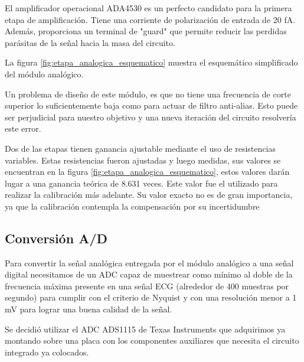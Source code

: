 \documentclass[conference]{IEEEtran}
\begin{document}
El amplificador operacional ADA4530  es un perfecto candidato para
la primera etapa de amplificación. Tiene una corriente de polarización de entrada de
20 fA. Además, proporciona un terminal de "guard" que permite reducir las perdidas
parásitas de la señal hacia la masa del circuito.
 
La figura \ref{fig:etapa_analogica_esquematico} muestra el esquemático simplificado
del módulo analógico.

Un problema de diseño de este módulo, es que no tiene una frecuencia de corte
superior lo suficientemente baja como para actuar de filtro anti-alias. Esto
puede ser perjudicial para nuestro objetivo y una nueva iteración del circuito
resolvería este error.


Dos de las etapas tienen ganancia ajustable mediante el uso de resistencias
variables. Estas resistencias fueron ajustadas y luego medidas, sus valores se
encuentran en la figura \ref{fig:etapa_analogica_esquematico}, estos valores
darán lugar a una ganancia teórica de 8.631 veces. Este valor fue el utilizado para
realizar la calibración más adelante. Su valor exacto no es de gran importancia,
ya que la calibración contempla la compensación por su incertidumbre 


\subsection{Conversión A/D}

Para convertir la señal analógica entregada por el módulo analógico a una señal
digital necesitamos de un ADC capaz de muestrear como mínimo al doble de la
frecuencia máxima presente en una señal ECG (alrededor de 400 muestras por segundo)
para cumplir con el criterio de Nyquist y con una resolución menor a 1 mV para
lograr una buena calidad de la señal.


Se decidió utilizar el ADC ADS1115 de Texas Instruments \cite{ads1115} que adquirimos
ya montando sobre una placa con los componentes auxiliares que necesita el
circuito integrado ya colocados.
\end{document}
